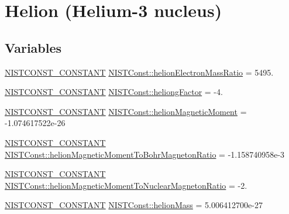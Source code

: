 \hypertarget{group___n_i_s_t_const-_helion}{}\section{Helion (Helium-\/3 nucleus)}
\label{group___n_i_s_t_const-_helion}
\subsection*{Variables}
\begin{DoxyCompactItemize}
\item 
\mbox{\hyperlink{group___n_i_s_t_const-_macros_ga2b0fc1d7452373f816175dd86ce26729}{N\+I\+S\+T\+C\+O\+N\+S\+T\+\_\+\+C\+O\+N\+S\+T\+A\+NT}} \mbox{\hyperlink{group___n_i_s_t_const-_helion_gadf681c0ed9b5f3fe2e62e225f129f699}{N\+I\+S\+T\+Const\+::helion\+Electron\+Mass\+Ratio}} = 5495.
\item 
\mbox{\hyperlink{group___n_i_s_t_const-_macros_ga2b0fc1d7452373f816175dd86ce26729}{N\+I\+S\+T\+C\+O\+N\+S\+T\+\_\+\+C\+O\+N\+S\+T\+A\+NT}} \mbox{\hyperlink{group___n_i_s_t_const-_helion_ga303daafecd6acf5afbe8f2c445c18c0f}{N\+I\+S\+T\+Const\+::heliong\+Factor}} = -\/4.
\item 
\mbox{\hyperlink{group___n_i_s_t_const-_macros_ga2b0fc1d7452373f816175dd86ce26729}{N\+I\+S\+T\+C\+O\+N\+S\+T\+\_\+\+C\+O\+N\+S\+T\+A\+NT}} \mbox{\hyperlink{group___n_i_s_t_const-_helion_ga83ec662aeec1a0bfedbfee91f5f7ac82}{N\+I\+S\+T\+Const\+::helion\+Magnetic\+Moment}} = -\/1.\+074617522e-\/26
\item 
\mbox{\hyperlink{group___n_i_s_t_const-_macros_ga2b0fc1d7452373f816175dd86ce26729}{N\+I\+S\+T\+C\+O\+N\+S\+T\+\_\+\+C\+O\+N\+S\+T\+A\+NT}} \mbox{\hyperlink{group___n_i_s_t_const-_helion_gad4975796a0210fccba98195f197e9c68}{N\+I\+S\+T\+Const\+::helion\+Magnetic\+Moment\+To\+Bohr\+Magneton\+Ratio}} = -\/1.\+158740958e-\/3
\item 
\mbox{\hyperlink{group___n_i_s_t_const-_macros_ga2b0fc1d7452373f816175dd86ce26729}{N\+I\+S\+T\+C\+O\+N\+S\+T\+\_\+\+C\+O\+N\+S\+T\+A\+NT}} \mbox{\hyperlink{group___n_i_s_t_const-_helion_ga8de697d928cd6d251f71e4eac6897d5a}{N\+I\+S\+T\+Const\+::helion\+Magnetic\+Moment\+To\+Nuclear\+Magneton\+Ratio}} = -\/2.
\item 
\mbox{\hyperlink{group___n_i_s_t_const-_macros_ga2b0fc1d7452373f816175dd86ce26729}{N\+I\+S\+T\+C\+O\+N\+S\+T\+\_\+\+C\+O\+N\+S\+T\+A\+NT}} \mbox{\hyperlink{group___n_i_s_t_const-_helion_ga430422e49132ee63ad7ca1371cd87d8f}{N\+I\+S\+T\+Const\+::helion\+Mass}} = 5.\+006412700e-\/27

\end{DoxyCompactItemize}
